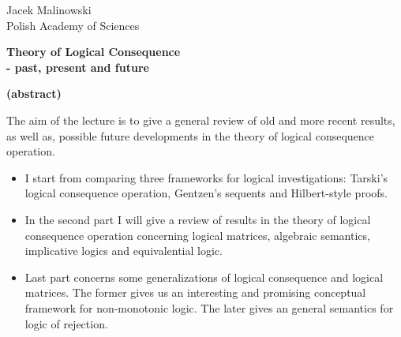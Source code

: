 \documentclass[12pt]{article}
\newcommand{\n}{\noindent}
\begin{document}
\begin{center}
Jacek Malinowski\\
Polish Academy of Sciences\\

\vskip1cm

{\Large \textbf{Theory of Logical Consequence\\
- past, present and future}}
\end{center}

\vskip2cm

\begin{center}
{\bf (abstract)}
\end{center}

\n The aim of the lecture is to give a general review of old and
more recent results, as well as, possible future developments in
the theory of logical consequence operation.

\begin{itemize}
  \item I start from comparing three frameworks for logical
investigations: Tarski's logical consequence operation, Gentzen's
sequents and Hilbert-style proofs.
  \item In the second part I will give a review of results in the
theory of logical consequence operation concerning logical
matrices, algebraic semantics, implicative logics and
equivalential logic.
  \item Last part concerns some generalizations of logical
consequence and logical matrices. The former gives us an interesting and promising conceptual framework for non-monotonic logic. The later gives an general semantics for logic of rejection.    
\end{itemize}
\end{document}
